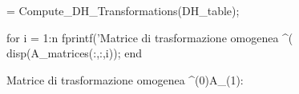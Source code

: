 \documentclass[11pt, a4paper]{article}
\begin{document}
\begin{matlabcode}
 = Compute_DH_Transformations(DH_table);

for i = 1:n
    fprintf('Matrice di trasformazione omogenea ^(%
    disp(A_matrices(:,:,i));
end
\end{matlabcode}
\begin{matlaboutput}
Matrice di trasformazione omogenea ^(0)A_(1):
\end{matlaboutput}
\end{document}
